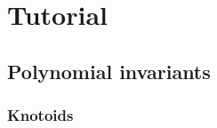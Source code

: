 % 
% 
% 
% 

\section{\label{sec:tutorial}Tutorial}

\subsection{Polynomial invariants}
\subsubsection{\label{sec:knotoids}Knotoids}

